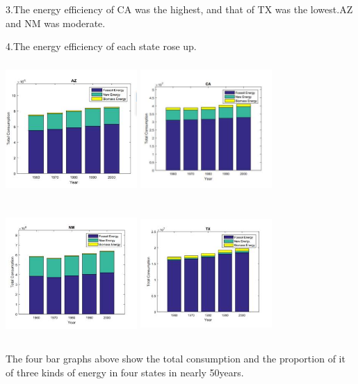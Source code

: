 \documentclass[12pt]{article}
\begin{document}
3.The energy efficiency of CA was the highest, and that of TX was the lowest.AZ and NM was moderate.

4.The energy efficiency of each state rose up.



\includegraphics[width=5cm,height=5cm]{AZ.jpg}
\includegraphics[width=5cm,height=5cm]{CA.jpg}

\includegraphics[width=5cm,height=5cm]{NM.jpg}
\includegraphics[width=5cm,height=5cm]{TX.jpg}

The four bar graphs above show the total consumption and the proportion of it of three kinds of energy in four states in nearly 50years.
\end{document}
